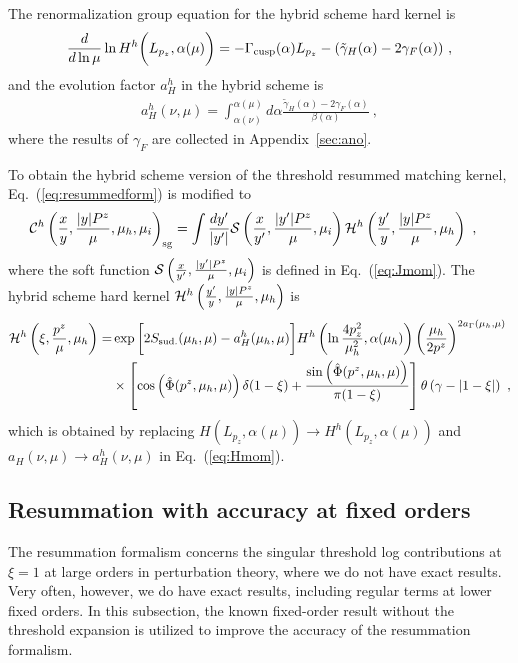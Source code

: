 \documentclass[a4paper,11pt]{article}
\begin{document}
The renormalization group equation for the hybrid scheme hard kernel is
\begin{align}
\frac{d}{d\ln \mu} \ln H^h\bigg(L_{p_z},\alpha(\mu)\bigg)=-\Gamma_{\rm cusp}(\alpha)L_{p_z}-(\tilde {\gamma}_{H}(\alpha)-2\gamma_F(\alpha)) \ ,
\end{align}
and the evolution factor $a_H^h$ in the hybrid scheme is
\begin{align}\label{eq:ahevo}
a_H^h(\nu,\mu)=\int_{\alpha(\nu)}^{\alpha(\mu)} d\alpha\frac{\tilde {\gamma}_{H}(\alpha)-2\gamma_F(\alpha)}{\beta(\alpha)} \ ,
\end{align}
where the results of $\gamma_F$ are collected in Appendix~\ref{sec:ano}. 

To obtain the hybrid scheme version of the threshold resummed matching kernel, Eq.~(\ref{eq:resummedform}) is modified to
\begin{align}\label{eq:resummedformhybrid}
&{\cal C}^{h}\left(\frac{x}{y},\frac{|y|P^z}{\mu},\mu_h,\mu_i\right)_{\rm sg}= \int \frac{d y'}{|y'|} {\cal S}\left( \frac{x}{y'},\frac{|y'|P^z}{\mu},\mu_i\right) {\cal H}^{h}\left( \frac{y'}{y},\frac{|y|P^z}{\mu},\mu_h\right) \ ,
\end{align}
where the soft function ${\cal S}\left( \frac{x}{y'},\frac{|y'|P^z}{\mu},\mu_i\right)$ is defined in Eq.~(\ref{eq:Jmom}). The hybrid scheme hard kernel ${\cal H}^{h}\left( \frac{y'}{y},\frac{|y|P^z}{\mu},\mu_h\right)$ is
\begin{align}\label{eq:Hmomhybrid}
{\cal H}^{h}\left( \xi,\frac{p^z}{\mu},\mu_h\right) 
=& \exp \bigg[2S_{\rm sud.}(\mu_h,\mu)-a^{h}_{H}(\mu_h,\mu)\bigg]H^{h}\left(\ln \frac{4p_z^2}{\mu_h^2},\alpha(\mu_h)\right) \left(\frac{\mu_h}{2 p^z}\right)^{2 a_{\Gamma}(\mu_h,\mu)} \nonumber\\
&\times \left[ \cos\left(\hat \Phi(p^z,\mu_h,\mu)\right) \delta(1-\xi) + \frac{\sin\left(\hat \Phi(p^z,\mu_h,\mu)\right)}{\pi(1-\xi)}\right] \theta\left(\gamma-|1-\xi|\right)\ ,
\end{align}
which is obtained by replacing $H\left(L_{p_z},\alpha(\mu)\right) \rightarrow H^h\left(L_{p_z},\alpha(\mu)\right)$ and $a_H(\nu,\mu) \rightarrow a_H^h(\nu,\mu)$ in Eq.~(\ref{eq:Hmom}). 


\subsection{Resummation with accuracy at fixed orders}\label{sec:Rfix}

The resummation formalism concerns the 
singular threshold log contributions at $\xi=1$ at large orders in perturbation theory, where we do not have exact results. 
Very often, however, we do have exact results, including regular terms at lower fixed orders. 
In this subsection, the known fixed-order result without the threshold expansion is utilized to improve the accuracy of the resummation formalism. 
\end{document}
